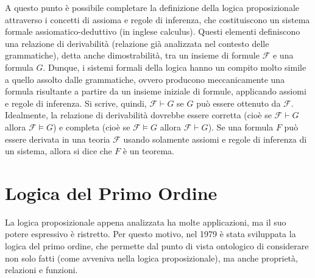 A questo punto è possibile completare la definizione della logica proposizionale attraverso i concetti di assioma e regole di inferenza, che costituiscono un sistema formale assiomatico-deduttivo (in inglese calculus). Questi elementi definiscono una relazione di derivabilità (relazione già analizzata nel contesto delle grammatiche), detta anche dimostrabilità, tra un insieme di formule \(\mathcal F\) e una formula \(G\). Dunque, i sistemi formali della logica hanno un compito molto simile a quello assolto dalle grammatiche, ovvero producono meccanicamente una formula risultante a partire da un insieme iniziale di formule, applicando assiomi e regole di inferenza. Si scrive, quindi, \(\mathcal F \vdash G\) se \(G\) può essere ottenuto da \(\mathcal F\). Idealmente, la relazione di derivabilità dovrebbe essere corretta (cioè se \(\mathcal F \vdash G\) allora \(\mathcal F \vDash G\)) e completa (cioè se \(\mathcal F\vDash G\) allora \(\mathcal F\vdash G\)). Se una formula \(F\) può essere derivata in una teoria \(\mathcal F\) usando solamente assiomi e regole di inferenza di un sistema, allora si dice che \(F\) è un teorema. 

\section{Logica del Primo Ordine}
La logica proposizionale appena analizzata ha molte applicazioni, ma il suo potere espressivo è ristretto. Per questo motivo, nel 1979 è stata sviluppata  la logica del primo ordine, che permette dal punto di vista ontologico di considerare non solo fatti (come avveniva nella logica proposizionale), ma anche proprietà, relazioni e funzioni. 

